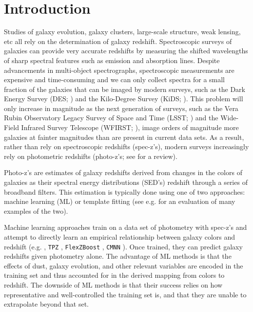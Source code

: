 \documentclass[twocolumn]{aastex63}
\begin{document}

\section{Introduction}
    Studies of galaxy evolution, galaxy clusters, large-scale structure, weak lensing, etc all rely on the determination of galaxy redshift.
    Spectroscopic surveys of galaxies can provide very accurate redshifts by measuring the shifted wavelengths of sharp spectral features such as emission and absorption lines.
    Despite advancements in multi-object spectrographs, spectroscopic measurements are expensive and time-consuming and we can only collect spectra for a small fraction of the galaxies that can be imaged by  modern surveys, such as the Dark Energy Survey (DES; \citealt{TheDarkEnergySurveyCollaboration2005}) and the Kilo-Degree Survey (KiDS; \citealt{DeJong2013a}).
    This problem will only increase in magnitude as the next generation of surveys, such as the Vera Rubin Observatory Legacy Survey of Space and Time (LSST; \citealt{LSSTScienceCollaboration2009}) and the Wide-Field Infrared Survey Telescope (WFIRST; \citealt{Green2012}), image orders of magnitude more galaxies at fainter magnitudes than are present in current data sets.
    As a result, rather than rely on spectroscopic redshifts (spec-z's), modern surveys increasingly rely on photometric redshifts (photo-z's; see \citealt{Salvato2019} for a review).

    Photo-z's are estimates of galaxy redshifts derived from changes in the colors of galaxies as their spectral energy distributions (SED's) redshift through a series of broadband filters.
    This estimation is typically done using one of two approaches: machine learning (ML) or template fitting (see e.g. \citealt{Schmidt2020} for an evaluation of many examples of the two).

    Machine learning approaches train on a data set of photometry with spec-z's and attempt to directly learn an empirical relationship between galaxy colors and redshift (e.g. \citealt{Connolly1995}, \texttt{TPZ} \citealt{Kind2013}, \texttt{FlexZBoost} \citealt{Izbicki2017}, \texttt{CMNN} \citealt{Graham2018a}).
    Once trained, they can predict galaxy redshifts given photometry alone.
    The advantage of ML methods is that the effects of dust, galaxy evolution, and other relevant variables are encoded in the training set and thus accounted for in the derived mapping from colors to redshift.
    The downside of ML methods is that their success relies on how representative and well-controlled the training set is, and that they are unable to extrapolate beyond that set.
\end{document}
